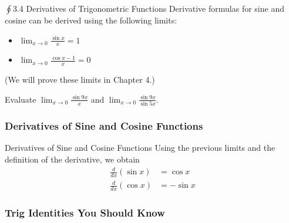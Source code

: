 \documentclass[cal1spr16Lectures.tex]{subfiles}
\begin{document}
\begin{frame}{$\oint$3.4 Derivatives of Trigonometric Functions}
Derivative formulas for sine and cosine can be derived using the following limits:
\begin{itemize}
	\item $\lim_{x \to 0} \frac{\sin x}{x}=1$
	\item $\lim_{x \to 0} \frac{\cos x -1}{x}=0$
\end{itemize}
(We will prove these limits in Chapter 4.)
\end{frame}

\begin{frame}
\begin{exe} Evaluate $\displaystyle\lim_{x \to 0} \frac{\sin 9x}{x}$ and $\displaystyle\lim_{x \to 0} \frac{\sin 9x}{\sin 5x}.$ \end{exe}
\end{frame}

\subsubsection{Derivatives of Sine and Cosine Functions}

\begin{frame}{\small Derivatives of Sine and Cosine Functions}
Using the previous limits and the definition of the derivative, we obtain
\begin{align*}
\frac{d}{dx} (\sin x) &= \cos x \\
\frac{d}{dx} (\cos x) &= -\sin x
\end{align*}
\end{frame}

\subsubsection{Trig Identities You Should Know}
\end{document}
